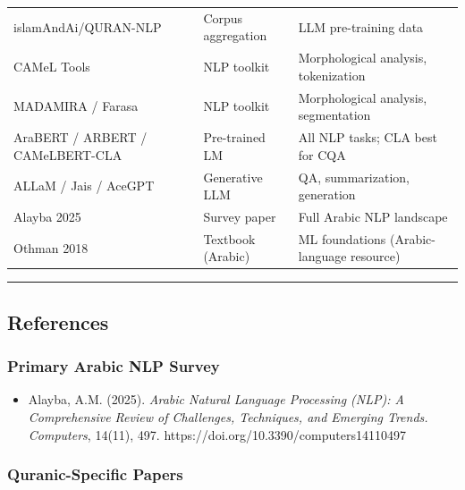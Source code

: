 \documentclass[12pt,a4paper]{article}
\providecommand{\tightlist}{\setlength{\itemsep}{0pt}\setlength{\parskip}{0pt}}
\begin{document}
{\begin{longtable}[]{@{}lll@{}}
islamAndAi/QURAN-NLP & Corpus aggregation & LLM pre-training data \\
CAMeL Tools & NLP toolkit & Morphological analysis, tokenization \\
MADAMIRA / Farasa & NLP toolkit & Morphological analysis,
segmentation \\
AraBERT / ARBERT / CAMeLBERT-CLA & Pre-trained LM & All NLP tasks; CLA
best for CQA \\
ALLaM / Jais / AceGPT & Generative LLM & QA, summarization,
generation \\
Alayba 2025 & Survey paper & Full Arabic NLP landscape \\
Othman 2018 & Textbook (Arabic) & ML foundations (Arabic-language
resource) \\
\end{longtable}
}

\begin{center}\rule{0.5\linewidth}{0.5pt}\end{center}

\protect{}\label{s17}
\subsection{References}\label{references}

\subsubsection{Primary Arabic NLP
Survey}\label{primary-arabic-nlp-survey}

\begin{itemize}
\tightlist
\item
  Alayba, A.M. (2025). \emph{Arabic Natural Language Processing (NLP): A
  Comprehensive Review of Challenges, Techniques, and Emerging Trends.}
  \emph{Computers}, 14(11), 497.
  https://doi.org/10.3390/computers14110497
\end{itemize}

\subsubsection{Quranic-Specific Papers}\label{quranic-specific-papers}
\end{document}
